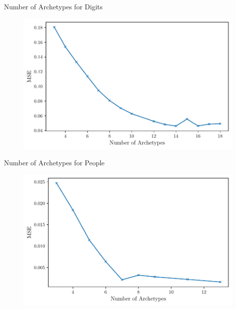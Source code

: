 \documentclass[aspectratio=169]{beamer}
\begin{document}
\begin{frame}{Number of Archetypes for Digits}
\begin{figure}[htpb]
	\includegraphics[height=0.7\textheight]{figures/samples/aa_mse_EMNIST.pdf}
\end{figure}
\end{frame}

\begin{frame}{Number of Archetypes for People}
\begin{figure}[htpb]
	\includegraphics[height=0.7\textheight]{figures/samples/aa_mse_FERG.pdf}
\end{figure}
\end{frame}
\end{document}
